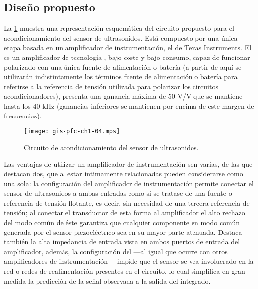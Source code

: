 

\subsection{Diseño propuesto}

La \cref{fig:sensor-conditioner} muestra una representación esquemática del
circuito propuesto para el acondicionamiento del sensor de ultrasonidos.
Está compuesto por una única etapa basada en un amplificador de
instrumentación, el  de Texas Instruments. El  es
un amplificador de tecnología , bajo coste y bajo consumo, capaz
de funcionar polarizado con una única fuente de alimentación o batería (a
partir de aquí se utilizarán indistintamente los términos fuente de
alimentación o batería para referirse a la referencia de tensión utilizada
para polarizar los circuitos acondicionadores), presenta una ganancia
máxima de 50 V/V que se mantiene hasta los 40 kHz (ganancias inferiores se
mantienen por encima de este margen de frecuencias).

\begin{figure}
    \begin{center}
	\texttt{[image: gis-pfc-ch1-04.mps]}
    \end{center}
    \caption[Circuito de acondicionamiento del sensor
    piezoeléctrico]{Circuito de acondicionamiento del sensor de
    ultrasonidos.}
    \label{fig:sensor-conditioner}
\end{figure}

Las ventajas de utilizar un amplificador de instrumentación son varias, de
las que destacan dos, que al estar íntimamente relacionadas pueden
considerarse como una sola: la configuración del amplificador de
instrumentación permite conectar el sensor de ultrasonidos a ambas entradas
como si se tratase de una fuente o referencia de tensión flotante, es
decir, sin necesidad de una tercera referencia de tensión; al conectar el
transductor de esta forma al amplificador el alto rechazo del modo común de
éste garantiza que cualquier componente en modo común generada por el
sensor piezoeléctrico sea en su mayor parte atenuada. Destaca también la
alta impedancia de entrada vista en ambos puertos de entrada del
amplificador, además, la configuración del  ---al igual que
ocurre con otros amplificadores de instrumentación--- impide que el sensor
se vea involucrado en la red o redes de realimentación presentes en el
circuito, lo cual simplifica en gran medida la predicción de la señal
observada a la salida del integrado.

